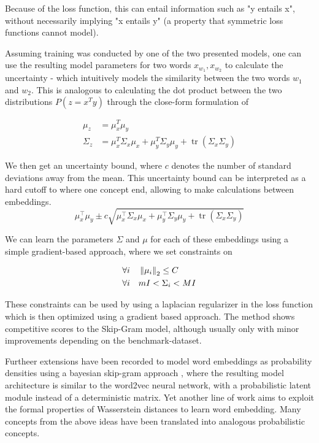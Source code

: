 \documentclass[a4paper,12pt,twoside,openright]{report}
\begin{document}
Because of the loss function, this can entail information such as "y entails x", without necessarily implying "x entails y" (a property that symmetric loss functions cannot model).

Assuming training was conducted by one of the two presented models,  one can use the resulting model parameters for two words $x_{w_1}, x_{w_2}$ to calculate the uncertainty - which intuitively models the similarity between the two words $w_1$ and $w_2$.
This is analogous to calculating the dot product between the two distributions $P(z=x^T y)$ through the close-form formulation of

\begin{align}
\mu_z &= \mu_x^T \mu_y \\
\Sigma_z &= \mu_{x}^T \Sigma_{x} \mu_{x}+\mu_{y}^T \Sigma_{y} \mu_{y}+\operatorname{tr}\left(\Sigma_{x} \Sigma_{y}\right)
\end{align}

We then get an uncertainty bound, where $c$ denotes the number of standard deviations away from the mean.
This uncertainty bound can be interpreted as a hard cutoff to where one concept end, allowing to make calculations between embeddings.
\begin{equation}
\mu_{x}^{\top} \mu_{y} \pm c \sqrt{\mu_{x}^{\top} \Sigma_{x} \mu_{x}+\mu_{y}^{\top} \Sigma_{y} \mu_{y}+\operatorname{tr}\left(\Sigma_{x} \Sigma_{y}\right)}
\end{equation}

We can learn the parameters $\Sigma$ and $\mu$ for each of these embeddings using a simple gradient-based approach, where we set constraints on 

\begin{align}
\forall i \quad & \left\lVert \mu_i \right\rVert_2  \leq C\\
\forall i \quad & m I <  \Sigma_i < M I
\end{align}

These constraints can be used by using a laplacian regularizer in the loss function which is then optimized using a gradient based approach. 
The method shows competitive scores to the Skip-Gram model, although usually only with minor improvements depending on the benchmark-dataset.

Furtheer extensions have been recorded to model word embeddings as probability densities using a bayesian skip-gram approach \cite{brazinskas19}, where the resulting model architecture is similar to the word2vec neural network, with a probabilistic latent module instead of a deterministic matrix.
Yet another line of work \cite{yan19} aims to exploit the formal properties of Wasserstein distances to learn word embedding.
Many concepts from the above ideas have been translated into analogous probabilistic concepts.
\end{document}
